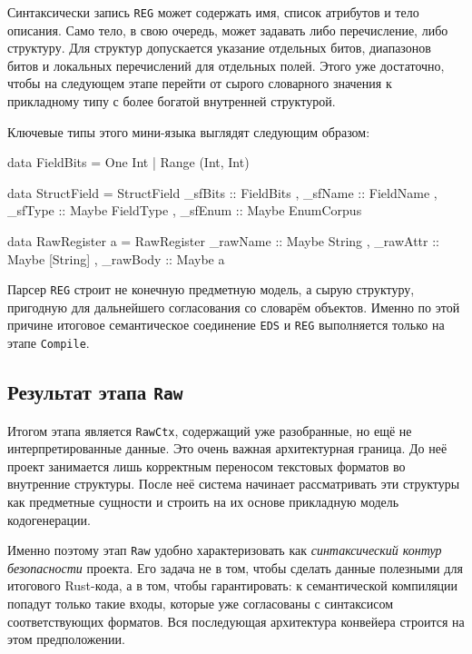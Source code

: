 \documentclass[a4paper,12pt]{article}
\begin{document}
Синтаксически запись \texttt{REG} может содержать имя, список атрибутов и тело
описания. Само тело, в свою очередь, может задавать либо перечисление, либо структуру.
Для структур допускается указание отдельных битов, диапазонов битов и локальных
перечислений для отдельных полей. Этого уже достаточно, чтобы на следующем этапе
перейти от сырого словарного значения к прикладному типу с более богатой внутренней
структурой.

Ключевые типы этого мини-языка выглядят следующим образом:

\begin{flushleft}
\label{lst:raw-reg-types}
\begin{MyCodes}
data FieldBits
  = One Int
  | Range (Int, Int)

data StructField = StructField
  { _sfBits :: FieldBits
  , _sfName :: FieldName
  , _sfType :: Maybe FieldType
  , _sfEnum :: Maybe EnumCorpus
  }

data RawRegister a = RawRegister
  { _rawName :: Maybe String
  , _rawAttr :: Maybe [String]
  , _rawBody :: Maybe a
  }
\end{MyCodes}
\end{flushleft}

Парсер \texttt{REG} строит не конечную предметную модель, а сырую структуру,
пригодную для дальнейшего согласования со словарём объектов. Именно по этой причине
итоговое семантическое соединение \texttt{EDS} и \texttt{REG} выполняется только на
этапе \texttt{Compile}.

\subsection{Результат этапа \texttt{Raw}}

Итогом этапа является \texttt{RawCtx}, содержащий уже разобранные, но ещё не
интерпретированные данные. Это очень важная архитектурная граница. До неё проект
занимается лишь корректным переносом текстовых форматов во внутренние структуры. После
неё система начинает рассматривать эти структуры как предметные сущности и строить на
их основе прикладную модель кодогенерации.

Именно поэтому этап \texttt{Raw} удобно характеризовать как \textit{синтаксический
контур безопасности} проекта. Его задача не в том, чтобы сделать данные полезными для
итогового Rust-кода, а в том, чтобы гарантировать: к семантической компиляции попадут
только такие входы, которые уже согласованы с синтаксисом соответствующих форматов.
Вся последующая архитектура конвейера строится на этом предположении.
\end{document}
